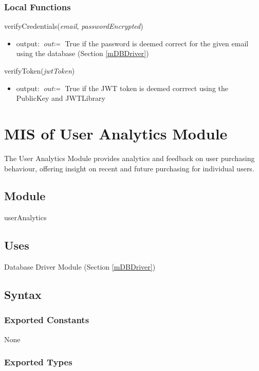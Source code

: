 \documentclass[12pt, titlepage]{article}
\begin{document}
\subsubsection{Local Functions}
verifyCredentials(\textit{email}, \textit{passwordEncrypted})
\begin{itemize}
\item output: \( \textit{out} \coloneqq \) True if the password is deemed correct for the given email using the database (Section \ref{mDBDriver})
\end{itemize}

\noindent verifyToken(\textit{jwtToken})
\begin{itemize}
\item output: \( \textit{out} \coloneqq \) True if the JWT token is deemed corrrect using the PublicKey and JWTLibrary
\end{itemize}

\newpage

\section{MIS of User Analytics Module} \label{mAnalytics} 
The User Analytics Module provides analytics and feedback on user purchasing behaviour, offering insight on recent and future purchasing for individual users.

\subsection{Module}

userAnalytics

\subsection{Uses}

Database Driver Module (Section \ref{mDBDriver})

\subsection{Syntax}

\subsubsection{Exported Constants}
None

\subsubsection{Exported Types}
\end{document}
